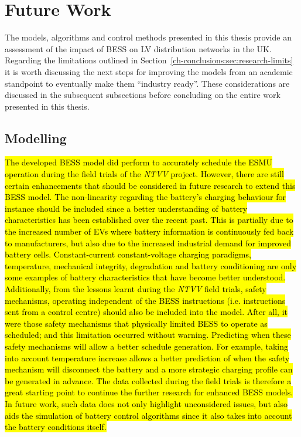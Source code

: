 \section{Future Work}
\label{ch-conclusions:sec:future-work}

The models, algorithms and control methods presented in this thesis provide an assessment of the impact of BESS on LV distribution networks in the UK.
Regarding the limitations outlined in Section~\ref{ch-conclusions:sec:research-limits} it is worth discussing the next steps for improving the models from an academic standpoint to eventually make them ``industry ready''.
These considerations are discussed in the subsequent subsections before concluding on the entire work presented in this thesis.

\subsection{Modelling}

\hl{The developed BESS model did perform to accurately schedule the ESMU operation during the field trials of the \textit{NTVV} project.
However, there are still certain enhancements that should be considered in future research to extend this BESS model.
The non-linearity regarding the battery's charging behaviour for instance should be included since a better understanding of battery characteristics has been established over the recent past.
This is partially due to the increased number of EVs where battery information is continuously fed back to manufacturers, but also due to the increased industrial demand for improved battery cells.
Constant-current constant-voltage charging paradigms, temperature, mechanical integrity, degradation and battery conditioning are only some examples of battery characteristics that have become better understood.
Additionally, from the lessons learnt during the \textit{NTVV} field trials, safety mechanisms, operating independent of the BESS instructions (i.e. instructions sent from a control centre) should also be included into the model.
After all, it were those safety mechanisms that physically limited BESS to operate as scheduled; and this limitation occurred without warning.
Predicting when these safety mechanisms will allow a better schedule generation.
For example, taking into account temperature increase allows a better prediction of when the safety mechanism will disconnect the battery and a more strategic charging profile can be generated in advance.
The data collected during the field trials is therefore a great starting point to continue the further research for enhanced BESS models.
In future work, such data does not only highlight unconsidered issues, but also aids the simulation of battery control algorithms since it also takes into account the battery conditions itself.}

